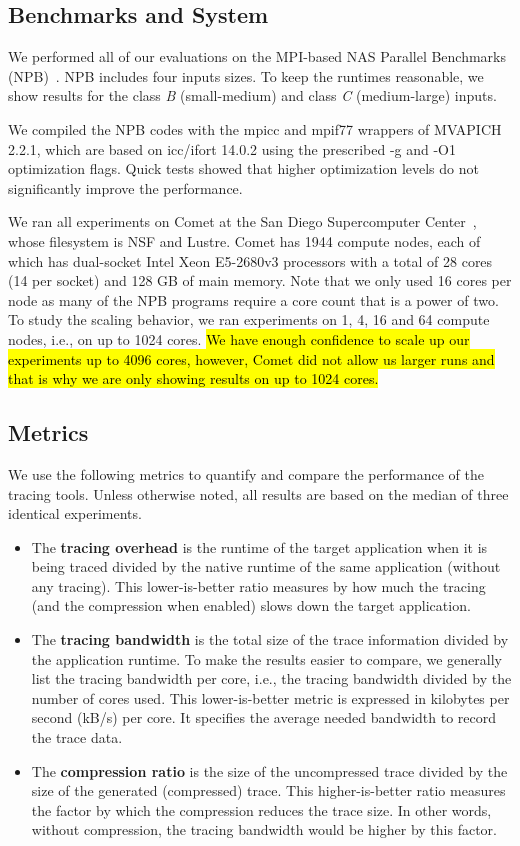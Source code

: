 \subsection{Benchmarks and System}

We performed all of our evaluations on the MPI-based NAS Parallel Benchmarks (NPB)~\cite{nas}. NPB includes four inputs sizes. To keep the runtimes reasonable, we show results for the class \textit{B} (small-medium) and class \textit{C} (medium-large) inputs.

We compiled the NPB codes with the mpicc and mpif77 wrappers of MVAPICH 2.2.1, which are based on icc/ifort 14.0.2 using the prescribed -g and -O1 optimization flags. Quick tests showed that higher optimization levels do not significantly improve the performance.

We ran all experiments on Comet at the San Diego Supercomputer Center~\cite{comet}, whose filesystem is NSF and Lustre. Comet has 1944 compute nodes, each of which has dual-socket Intel Xeon E5-2680v3 processors with a total of 28 cores (14 per socket) and 128 GB of main memory. Note that we only used 16 cores per node as many of the NPB programs require a core count that is a power of two. To study the scaling behavior, we ran experiments on 1, 4, 16 and 64 compute nodes, i.e., on up to 1024 cores. \hl{We have enough confidence to scale up our experiments up to 4096 cores, however, Comet did not allow us larger runs and that is why we are only showing results on up to 1024 cores.}


\subsection{Metrics}

We use the following metrics to quantify and compare the performance of the tracing tools. Unless otherwise noted, all results are based on the median of three identical experiments.
\begin{itemize}
\item The \textbf{tracing overhead} is the runtime of the target application when it is being traced divided by the native runtime of the same application (without any tracing). This lower-is-better ratio measures by how much the tracing (and the compression when enabled) slows down the target application.
\item The \textbf{tracing bandwidth} is the total size of the trace information divided by the application runtime. To make the results easier to compare, we generally list the tracing bandwidth per core, i.e., the tracing bandwidth divided by the number of cores used. This lower-is-better metric is expressed in kilobytes per second (kB/s) per core. It specifies the average needed bandwidth to record the trace data.
\item The \textbf{compression ratio} is the size of the uncompressed trace divided by the size of the generated (compressed) trace. This higher-is-better ratio measures the factor by which the compression reduces the trace size. In other words, without compression, the tracing bandwidth would be higher by this factor.
\end{itemize}


